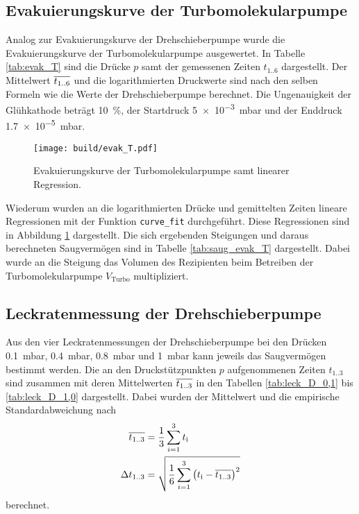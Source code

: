\subsection{Evakuierungskurve der Turbomolekularpumpe}
\label{sec:AuswEvaT}

Analog zur Evakuierungskurve der Drehschieberpumpe wurde die Evakuierungskurve
der Turbomolekularpumpe ausgewertet. In Tabelle \ref{tab:evak_T} sind die
Drücke $p$ samt der gemessenen Zeiten $t_\text{1..6}$
dargestellt. Der Mittelwert $\overline{t_\text{1..6}}$ und die logarithmierten
Druckwerte sind nach den selben Formeln wie die Werte der Drehschieberpumpe
berechnet. Die Ungenauigkeit der Glühkathode beträgt \SI{10}{\percent}, der
Startdruck \SI{5e-3}{\milli\bar} und der Enddruck
\SI{1.7e-5}{\milli\bar}.



\begin{figure}
  \centering
  \texttt{[image: build/evak\_T.pdf]}
  \caption{Evakuierungskurve der Turbomolekularpumpe samt linearer Regression.}
  \label{fig:evak_T}
\end{figure}

Wiederum wurden an die logarithmierten Drücke und gemittelten Zeiten
lineare Regressionen mit der Funktion \texttt{curve\_fit} durchgeführt.
Diese Regressionen sind in Abbildung \ref{fig:evak_T} dargestellt.
Die sich ergebenden Steigungen und daraus berechneten Saugvermögen sind in
Tabelle \ref{tab:saug_evak_T} dargestellt. Dabei wurde an die Steigung das
Volumen des Rezipienten beim Betreiben der Turbomolekularpumpe $V_\text{Turbo}$
multipliziert.




\subsection{Leckratenmessung der Drehschieberpumpe}
\label{sec:AuswLeckD}

Aus den vier Leckratenmessungen der Drehschieberpumpe
bei den Drücken \SI{0.1}{\milli\bar},
\SI{0.4}{\milli\bar}, \SI{0.8}{\milli\bar} und \SI{1}{\milli\bar}
kann jeweils das Saugvermögen bestimmt werden.
Die an den Druckstützpunkten $p$ aufgenommenen
Zeiten $t_\text{1..3}$ sind zusammen mit deren Mittelwerten $\overline{t_\text{1..3}}$
in den Tabellen \ref{tab:leck_D_0,1} bis \ref{tab:leck_D_1,0} dargestellt.
Dabei wurden der Mittelwert und die empirische Standardabweichung nach
\begin{align*}
  \overline{t_\text{1..3}} &= \frac{1}{3} \sum_{i = 1}^3 t_\text{i} \\
  \Delta t_\text{1..3} &=
  \sqrt{\frac{1}{6} \sum_{i = 1}^3 \left(t_\text{i} - \overline{t_\text{1..3}}\right)^2}
\end{align*}
berechnet.

